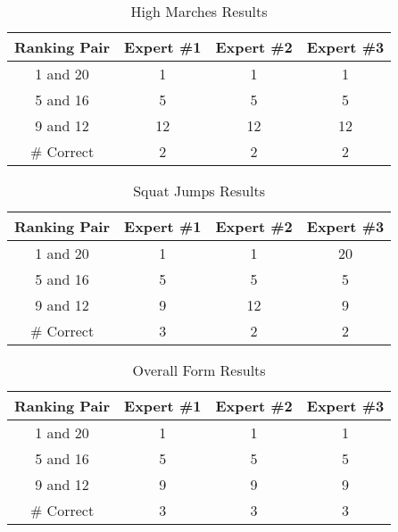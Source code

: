 \begin{table}[h!]
\caption{High Marches Results}
\centering
\begin{tabular}{c c c c}
\hline \hline
Ranking Pair & Expert \#1 & Expert \#2 & Expert \#3 \\ [0.5ex]
\hline
1 and 20 &		1&		1&		1 \\
5 and 16 &		5&		5&		5 \\
9 and 12 &		12&		12&		12 \\
\hline
\# Correct&		2&		2&		2 \\
\end{tabular}
\label{table:highmarchesresult}
\end{table}

\begin{table}[h!]
\caption{Squat Jumps Results}
\centering
\begin{tabular}{c c c c}
\hline \hline
Ranking Pair & Expert \#1 & Expert \#2 & Expert \#3 \\ [0.5ex]
\hline
1 and 20 &		1&		1&		20 \\
5 and 16 &		5&		5&		5 \\
9 and 12 &		9&		12&		9 \\
\hline
\# Correct&		3&		2&		2 \\
\end{tabular}
\label{table:squatjumpsresult}
\end{table}

\begin{table}[h!]
\caption{Overall Form Results}
\centering
\begin{tabular}{c c c c}
\hline \hline
Ranking Pair & Expert \#1 & Expert \#2 & Expert \#3 \\ [0.5ex]
\hline
1 and 20 &		1&		1&		1 \\
5 and 16 &		5&		5&		5 \\
9 and 12 &		9&		9&		9 \\
\hline
\# Correct&		3&		3&		3 \\
\end{tabular}
\label{table:overallformresult}
\end{table}